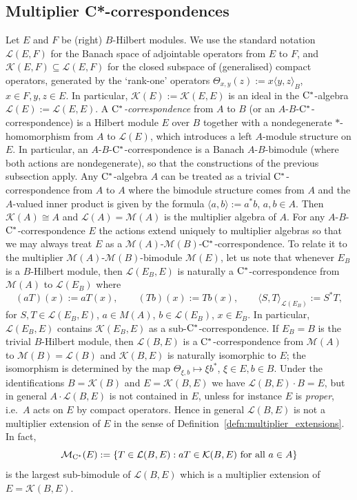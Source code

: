 \documentclass[11 pt, leqno]{amsart}
\numberwithin{equation}{section}
\theoremstyle{plain}
\theoremstyle{definition}
\newcommand{\M}{\mathcal M}
\newcommand{\K}{\mathcal{K}}
\renewcommand{\L}{\mathcal L}
\newcommand{\cst}{\ifmmode\mathrm{C}^*\else{$\mathrm{C}^*$}\fi}
\begin{document}
%
\subsection{Multiplier C*-correspondences}

Let $E$ and $F$ be (right) $B$-Hilbert modules. 
We use the standard notation $\L(E,F)$ for the Banach space of adjointable operators from $E$ to $F$, and $\K(E,F)\subseteq \L(E,F)$ for the closed subspace of (generalised) compact operators, generated by the `rank-one' operators $\Theta_{x,y}(z):=x\langle y, z\rangle_B$, $x \in F, y, z\in E$. 
In particular, $\K(E):=\K(E,E)$ is an ideal in the $\cst$-algebra $\L(E):=\L(E,E)$. 
A $\cst$\emph{-correspondence} from $A$ to $B$ (or an $A$-$B$-$\cst$-correspondence) is a Hilbert module $E$ over $B$ together with a nondegenerate $*$-homomorphism from $A$ to $\L(E)$, which introduces a left $A$-module structure on $E$.
In particular, an $A$-$B$-$\cst$-correspondence is a Banach $A$-$B$-bimodule (where both actions are nondegenerate), so that the constructions of the previous subsection apply.
Any $\cst$-algebra $A$ can be treated as a trivial $\cst$-correspondence from $A$ to $A$ where the bimodule structure comes from $A$ and the $A$-valued inner product is given by the formula $\langle a, b\rangle:=a^*b$, $a,b\in A$. Then $\K(A)\cong A$ and $\L(A)=\M(A)$ is the multiplier algebra of $A$. 
For any $A$-$B$-$\cst$-correspondence $E$ the actions extend uniquely to multiplier algebras so that we may always treat $E$  as a $\M(A)$-$\M(B)$-$\cst$-correspondence. 
To relate it to the multiplier $\M(A)$-$\M(B)$-bimodule $\M(E)$, let us note that whenever $E_B$ is a $B$-Hilbert module, then $\L(E_B,E)$ is naturally a $\cst$-correspondence from $\M(A)$ to $\L(E_B)$ where
\[
    (a T)(x) := a T(x),\qquad (T b) (x):= Tb(x),\qquad \langle S, T\rangle_{\L(E_B)} :=S^* T,
\]
for $S, T\in  \L(E_B,E)$, $a\in M(A)$, $b\in \L(E_B)$, $x\in E_B$. 
In particular, $\L(E_B,E)$ contains $\K(E_B,E)$ as a sub-$\cst$-correspondence. 
If $E_B=B$ is the trivial $B$-Hilbert module, then $\L(B,E)$ is a $\cst$-correspondence from $\M(A)$ to $\M(B)=\L(B)$ and $\K(B,E)$ is naturally isomorphic to $E$; the isomorphism is determined by the map $\Theta_{\xi,b}\mapsto \xi b^*$, $\xi \in E, b \in B$. 
Under the identifications $B=\K(B)$ and $E=\K(B,E)$ we have $\L(B,E)\cdot B=E$, but in general $A\cdot \L(B,E)$ is not contained in $E$, unless for instance $E$ is \emph{proper}, i.e.\ $A$ acts on $E$ by compact operators. 
Hence in general $\L(B,E)$ is not a multiplier extension of $E$ in the sense of Definition~\ref{defn:multiplier_extensions}.
In fact, 
\[
    \M_{\cst}(E):=\{T\in \L(B,E):  aT\in \K(B,E) \text{ for all }a\in A\}
\]
is the largest sub-bimodule of $\L(B,E)$ which is a multiplier extension of $E=\K(B,E)$. 
\end{document}
